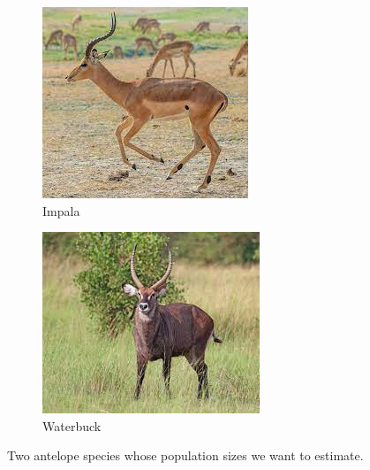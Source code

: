 \documentclass[a4paper,10pt, notitlepage]{report}
\begin{document}
\begin{figure}[H]
     \centering
     \begin{subfigure}[b]{0.45\textwidth}
         \centering
         \includegraphics[scale=0.75]{figures/impala.jpeg}
         \caption{Impala}
     \end{subfigure}
     \begin{subfigure}[b]{0.45\textwidth}
         \centering
         \includegraphics[scale=0.75]{figures/waterbuck.jpeg}
         \caption{Waterbuck}
     \end{subfigure}
        \caption{Two antelope species whose population sizes we want to estimate.}
        \label{fig:antelopes}
\end{figure}
\end{document}
